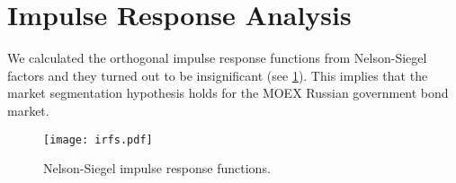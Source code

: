 \section{Impulse Response Analysis}\label{sec:IRA}
    We calculated the orthogonal impulse response functions from Nelson-Siegel factors and they turned out to be insignificant (see \cref{fig:nsirf}). This implies that the 
    market segmentation hypothesis holds for the MOEX Russian government bond market.

    \begin{figure}
        \texttt{[image: irfs.pdf]}
        \caption{Nelson-Siegel impulse response functions.}
        \label{fig:nsirf}
    \end{figure}
